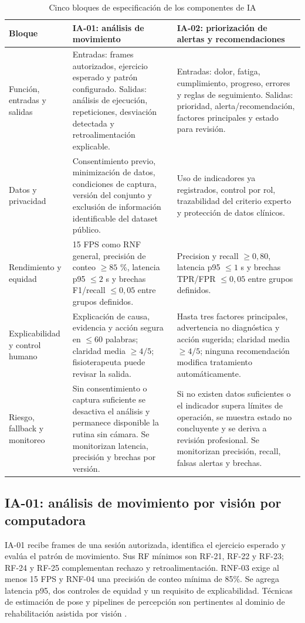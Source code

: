 \documentclass[12pt,a4paper]{article}
\begin{document}
\begin{table}[H]\centering\caption{Cinco bloques de especificación de los componentes de IA}
\small
\begin{tabularx}{\textwidth}{p{}X X}
\toprule
\textbf{Bloque}&\textbf{IA-01: análisis de movimiento}&\textbf{IA-02: priorización de alertas y recomendaciones}\\\midrule
Función, entradas y salidas&Entradas: frames autorizados, ejercicio esperado y patrón configurado. Salidas: análisis de ejecución, repeticiones, desviación detectada y retroalimentación explicable.&Entradas: dolor, fatiga, cumplimiento, progreso, errores y reglas de seguimiento. Salidas: prioridad, alerta/recomendación, factores principales y estado para revisión.\\
Datos y privacidad&Consentimiento previo, minimización de datos, condiciones de captura, versión del conjunto y exclusión de información identificable del dataset público.&Uso de indicadores ya registrados, control por rol, trazabilidad del criterio experto y protección de datos clínicos.\\
Rendimiento y equidad&15 FPS como RNF general, precisión de conteo $\geq85$ \%, latencia p95 $\leq2$ s y brechas F1/recall $\leq0,05$ entre grupos definidos.&Precision y recall $\geq0,80$, latencia p95 $\leq1$ s y brechas TPR/FPR $\leq0,05$ entre grupos definidos.\\
Explicabilidad y control humano&Explicación de causa, evidencia y acción segura en $\leq60$ palabras; claridad media $\geq4/5$; fisioterapeuta puede revisar la salida.&Hasta tres factores principales, advertencia no diagnóstica y acción sugerida; claridad media $\geq4/5$; ninguna recomendación modifica tratamiento automáticamente.\\
Riesgo, fallback y monitoreo&Sin consentimiento o captura suficiente se desactiva el análisis y permanece disponible la rutina sin cámara. Se monitorizan latencia, precisión y brechas por versión.&Si no existen datos suficientes o el indicador supera límites de operación, se muestra estado no concluyente y se deriva a revisión profesional. Se monitorizan precisión, recall, falsas alertas y brechas.\\
\bottomrule
\end{tabularx}
\normalsize
\end{table}


\subsection{IA-01: análisis de movimiento por visión por computadora}
IA-01 recibe frames de una sesión autorizada, identifica el ejercicio esperado y evalúa el patrón de movimiento. Sus RF mínimos son RF-21, RF-22 y RF-23; RF-24 y RF-25 complementan rechazo y retroalimentación. RNF-03 exige al menos 15 FPS y RNF-04 una precisión de conteo mínima de 85\%. Se agrega latencia p95, dos controles de equidad y un requisito de explicabilidad. Técnicas de estimación de pose y pipelines de percepción son pertinentes al dominio de rehabilitación asistida por visión \cite{cao2021,lugaresi2019,zheng2022}.
\end{document}
